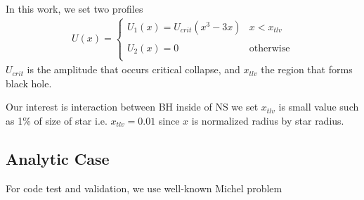 \documentclass[prd]{revtex4}
\begin{document}
In this work, we set two profiles
\begin{align}
U(x) =
\begin{cases}
U_1(x) = U_{crit} ( x^3 - 3x) & x < x_{tlv} \\
\\
U_2(x) = 0 & \textrm{otherwise} \\
\end{cases}
\end{align}
$U_{crit}$ is the amplitude that occurs critical collapse, and $x_{tlv}$ the region that forms black hole. 

Our interest is interaction between BH inside of NS we set $x_{tlv}$ is small value such as 1\% of size of star i.e. $x_{tlv} = 0.01$ since $x$ is normalized radius by star radius.

\subsection{Analytic Case}

For code test and validation, we use well-known Michel problem
\end{document}
